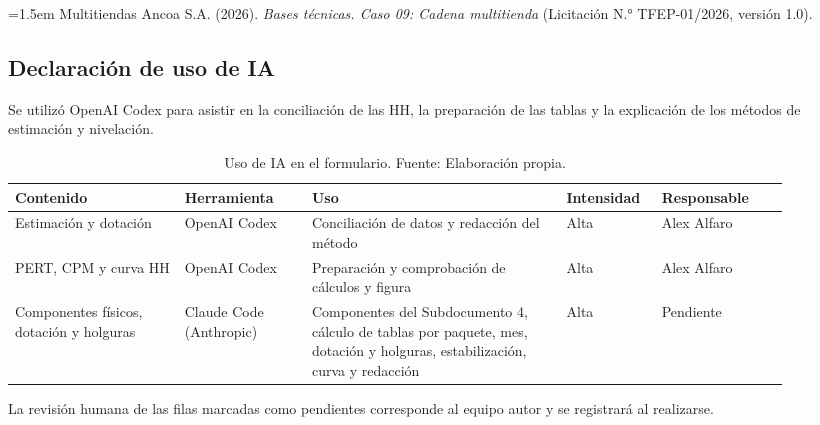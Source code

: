 \documentclass[11pt]{article}
\begin{document}
\noindent\hangindent=1.5em Multitiendas Ancoa S.A. (2026). \textit{Bases técnicas. Caso 09: Cadena multitienda} (Licitación N.° TFEP-01/2026, versión 1.0).

\subsection{Declaración de uso de IA}

Se utilizó OpenAI Codex para asistir en la conciliación de las HH, la preparación de las tablas y la explicación de los métodos de estimación y nivelación.

\begingroup
\small
\begin{longtable}{@{}p{0.2\linewidth}p{0.15\linewidth}p{0.3\linewidth}p{0.1\linewidth}p{0.15\linewidth}@{}}
\caption[Uso de IA en el formulario]{Uso de IA en el formulario. Fuente: Elaboración propia.}\label{tab:t15-15}\\
\toprule
\textbf{Contenido} & \textbf{Herramienta} & \textbf{Uso} & \textbf{Intensidad} & \textbf{Responsable} \\
\midrule
\endhead
\bottomrule
\endlastfoot
Estimación y dotación & OpenAI Codex & Conciliación de datos y redacción del método & Alta & Alex Alfaro \\
PERT, CPM y curva HH & OpenAI Codex & Preparación y comprobación de cálculos y figura & Alta & Alex Alfaro \\
Componentes físicos, dotación y holguras & Claude Code (Anthropic) & Componentes del Subdocumento 4, cálculo de tablas por paquete, mes, dotación y holguras, estabilización, curva y redacción & Alta & Pendiente \\
\end{longtable}
\endgroup

La revisión humana de las filas marcadas como pendientes corresponde al equipo autor y se registrará al realizarse.

\ossFinalPage
\end{document}
